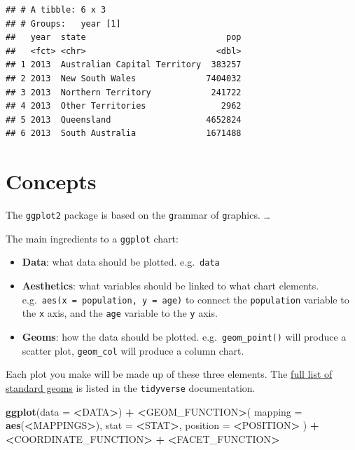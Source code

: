 \documentclass[]{book}
\newenvironment{Shaded}{\begin{snugshade}}{\end{snugshade}}
\newcommand{\DataTypeTok}[1]{\textcolor[rgb]{0.13,0.29,0.53}{#1}}
\newcommand{\ErrorTok}[1]{\textcolor[rgb]{0.64,0.00,0.00}{\textbf{#1}}}
\newcommand{\KeywordTok}[1]{\textcolor[rgb]{0.13,0.29,0.53}{\textbf{#1}}}
\newcommand{\NormalTok}[1]{#1}
\newcommand{\OperatorTok}[1]{\textcolor[rgb]{0.81,0.36,0.00}{\textbf{#1}}}
\newcommand{\StringTok}[1]{\textcolor[rgb]{0.31,0.60,0.02}{#1}}
\providecommand{\tightlist}{%
  \setlength{\itemsep}{0pt}\setlength{\parskip}{0pt}}
\begin{document}
\begin{verbatim}
## # A tibble: 6 x 3
## # Groups:   year [1]
##   year  state                            pop
##   <fct> <chr>                          <dbl>
## 1 2013  Australian Capital Territory  383257
## 2 2013  New South Wales              7404032
## 3 2013  Northern Territory            241722
## 4 2013  Other Territories               2962
## 5 2013  Queensland                   4652824
## 6 2013  South Australia              1671488
\end{verbatim}

\hypertarget{concepts}{%
\section{Concepts}\label{concepts}}

The \texttt{ggplot2} package is based on the \texttt{g}rammar of \texttt{g}raphics. \ldots{}

The main ingredients to a \texttt{ggplot} chart:

\begin{itemize}
\tightlist
\item
  \textbf{Data}: what data should be plotted. e.g.~\texttt{data}
\item
  \textbf{Aesthetics}: what variables should be linked to what chart elements. e.g.~\texttt{aes(x\ =\ population,\ y\ =\ age)} to connect the \texttt{population} variable to the \texttt{x} axis, and the \texttt{age} variable to the \texttt{y} axis.
\item
  \textbf{Geoms}: how the data should be plotted. e.g.~\texttt{geom\_point()} will produce a scatter plot, \texttt{geom\_col} will produce a column chart.
\end{itemize}

Each plot you make will be made up of these three elements. The \href{https://ggplot2.tidyverse.org/reference/}{full list of standard geoms} is listed in the \texttt{tidyverse} documentation.

\begin{Shaded}
\begin{Highlighting}[]
\KeywordTok{ggplot}\NormalTok{(}\DataTypeTok{data =} \OperatorTok{<}\NormalTok{DATA}\OperatorTok{>}\NormalTok{) }\OperatorTok{+}\StringTok{ }
\StringTok{  }\ErrorTok{<}\NormalTok{GEOM_FUNCTION}\OperatorTok{>}\NormalTok{(}
     \DataTypeTok{mapping =} \KeywordTok{aes}\NormalTok{(}\OperatorTok{<}\NormalTok{MAPPINGS}\OperatorTok{>}\NormalTok{),}
     \DataTypeTok{stat =} \OperatorTok{<}\NormalTok{STAT}\OperatorTok{>}\NormalTok{, }
     \DataTypeTok{position =} \OperatorTok{<}\NormalTok{POSITION}\OperatorTok{>}
\StringTok{  }\NormalTok{) }\OperatorTok{+}
\StringTok{  }\ErrorTok{<}\NormalTok{COORDINATE_FUNCTION}\OperatorTok{>}\StringTok{ }\OperatorTok{+}
\StringTok{  }\ErrorTok{<}\NormalTok{FACET_FUNCTION}\OperatorTok{>}
\end{Highlighting}
\end{Shaded}
\end{document}
